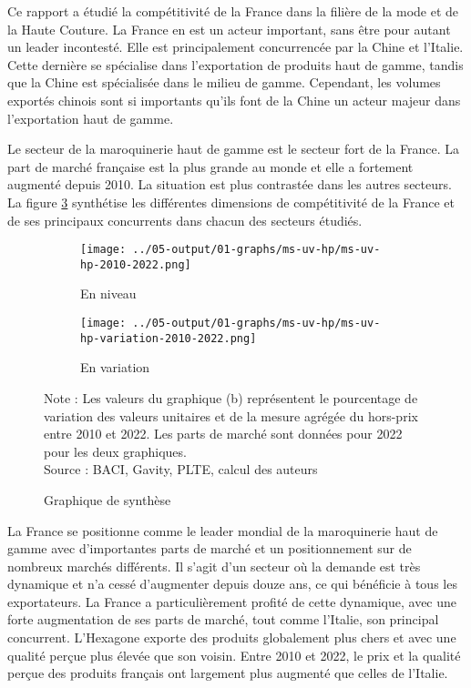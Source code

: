 \documentclass[french,10pt,a4paper]{article}
\begin{document}
Ce rapport a étudié la compétitivité de la France dans la filière de la mode et de la Haute Couture. La France en est un acteur important, sans être pour autant un leader incontesté. Elle est principalement concurrencée par la Chine et l'Italie. Cette dernière se spécialise dans l'exportation de produits haut de gamme, tandis que la Chine est spécialisée dans le milieu de gamme. Cependant, les volumes exportés chinois sont si importants qu'ils font de la Chine un acteur majeur dans l'exportation haut de gamme.

Le secteur de la maroquinerie haut de gamme est le secteur fort de la France. La part de marché française est la plus grande au monde et elle a fortement augmenté depuis 2010. La situation est plus contrastée dans les autres secteurs. La figure \ref{fig:graph-synthese} synthétise les différentes dimensions de compétitivité de la France et de ses principaux concurrents dans chacun des secteurs étudiés. 

\begin{figure}[!h]
  \centering
  \begin{subfigure}{\textwidth}
    \centering    \texttt{[image: ../05-output/01-graphs/ms-uv-hp/ms-uv-hp-2010-2022.png]}
    \caption{En niveau}
    \label{fig:ms-uv-hp}
  \end{subfigure}
  \vspace{0.5cm}
  \begin{subfigure}{\textwidth}
    \centering \texttt{[image: ../05-output/01-graphs/ms-uv-hp/ms-uv-hp-variation-2010-2022.png]}
 \caption{En variation}
 \label{fig:ms-uv-hp-variation}
  \end{subfigure}
  \captionsetup{justification=justified, singlelinecheck=false, font=small}
  \caption*{Note : Les valeurs du graphique (b) représentent le pourcentage de variation des valeurs unitaires et de la mesure agrégée du hors-prix entre 2010 et 2022. Les parts de marché sont données pour 2022 pour les deux graphiques.\\
  Source : BACI, Gavity, PLTE, calcul des auteurs}
  \captionsetup{justification=centering, singlelinecheck=true, font=normalsize}
  \caption{Graphique de synthèse}
  \label{fig:graph-synthese}
\end{figure}

\bigskip

La France se positionne comme le leader mondial de la maroquinerie haut de gamme avec d'importantes parts de marché et un positionnement sur de nombreux marchés différents. Il s'agit d'un secteur où la demande est très dynamique et n'a cessé d'augmenter depuis douze ans, ce qui bénéficie à tous les exportateurs. La France a particulièrement profité de cette dynamique, avec une forte augmentation de ses parts de marché, tout comme l'Italie, son principal concurrent. L'Hexagone exporte des produits globalement plus chers et avec une qualité perçue plus élevée que son voisin. Entre 2010 et 2022, le prix et la qualité perçue des produits français ont largement plus augmenté que celles de l'Italie.
\end{document}

